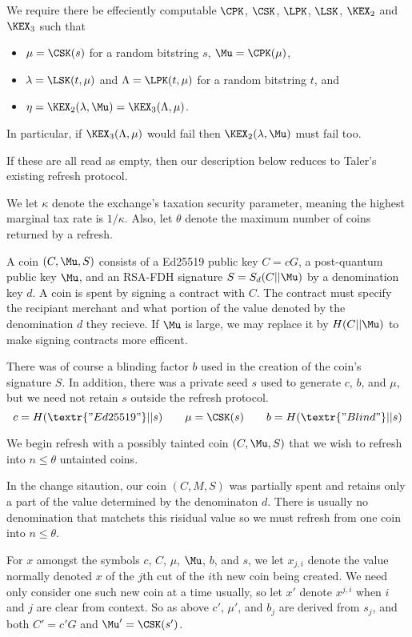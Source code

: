 \documentclass{llncs}
\begin{document}
We require there be effeciently computable
  $\CPK$, $\CSK$, $\LPK$, $\LSK$, $\KEX_2$ and $\KEX_3$  such that 
\begin{itemize}
\item  $\mu = \CSK(s)$ for a random bitstring $s$,
       $\Mu = \CPK(\mu)$,
\item  $\lambda = \LSK(t,\mu)$ and $\Lambda = \LPK(t,\mu)$
       for a random bitstring $t$, and
\item $\eta = \KEX_2(\lambda,\Mu) = \KEX_3(\Lambda,\mu)$.
\end{itemize}
In particular, if $\KEX_3(\Lambda,\mu)$ would fail
 then $\KEX_2(\lambda,\Mu)$ must fail too.

If these are all read as empty, then our description below reduces
to Taler's existing refresh protocol. 

\smallskip

We let $\kappa$ denote the exchange's taxation security parameter,
meaning the highest marginal tax rate is $1/\kappa$.  Also, let 
$\theta$ denote the maximum number of coins returned by a refresh.

A coin $(C,\Mu,S)$ consists of 
  a Ed25519 public key $C = c G$,
  a post-quantum public key $\Mu$, and
  an RSA-FDH signature $S = S_d(C || \Mu)$ by a denomination key $d$.
A coin is spent by signing a contract with $C$.  The contract must
specify the recipiant merchant and what portion of the value denoted
by the denomination $d$ they recieve.
If $\Mu$ is large, we may replace it by $H(C || \Mu)$ to make signing
contracts more efficent.

There was of course a blinding factor $b$ used in the creation of
the coin's signature $S$.  In addition, there was a private seed $s$
used to generate $c$, $b$, and $\mu$, but we need not retain $s$
outside the refresh protocol.
$$ c = H(\textr{"Ed25519"} || s)
\qquad \mu = \CSK(s)
\qquad b = H(\textr{"Blind"} || s) $$

\smallskip

We begin refresh with a possibly tainted coin $(C,\Mu,S)$ that
we wish to refresh into $n \le \theta$ untainted coins.  

In the change sitaution, our coin $(C,M,S)$ was partially spent and 
retains only a part of the value determined by the denominaton $d$.
There is usually no denomination that matchets this risidual value
so we must refresh from one coin into $n \le \theta$.

For $x$ amongst the symbols $c$, $C$, $\mu$, $\Mu$, $b$, and $s$,
we let $x_{j,i}$ denote the value normally denoted $x$ of
 the $j$th cut of the $i$th new coin being created. 
We need only consider one such new coin at a time usually, 
so let $x'$ denote $x^{j,i}$ when $i$ and $j$ are clear from context.
So as above $c'$, $\mu'$, and $b_j$ are derived from $s_j$,
 and both $C' = c' G$ and $\Mu' = \CSK(s')$.
\end{document}
